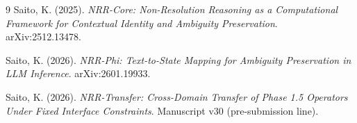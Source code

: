 \documentclass[11pt,a4paper]{article}
\begin{document}
\begin{thebibliography}{9}
Saito, K. (2025).
\textit{NRR-Core: Non-Resolution Reasoning as a Computational Framework for Contextual Identity and Ambiguity Preservation}.
arXiv:2512.13478.

Saito, K. (2026).
\textit{NRR-Phi: Text-to-State Mapping for Ambiguity Preservation in LLM Inference}.
arXiv:2601.19933.

Saito, K. (2026).
\textit{NRR-Transfer: Cross-Domain Transfer of Phase 1.5 Operators Under Fixed Interface Constraints}.
Manuscript v30 (pre-submission line).
\end{thebibliography}
\end{document}
